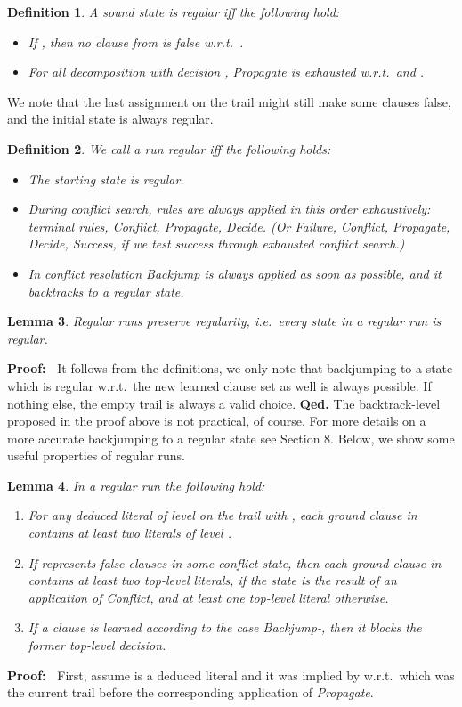 \documentclass[a4paper]{article}
\newcommand{\startproof}{{\bf Proof:~}}
\newcommand{\finishproof}{{\bf Qed.}}
\newtheorem{defi}{Definition}[section]
\newtheorem{lemm}[defi]{Lemma}
\begin{document}
{\begin{defi}\label{regStateDef}
A sound state  is \emph{regular} iff the following hold:
	\begin{itemize}
		\item If , then no clause from  is false w.r.t.\ .
		\item For all decomposition  with decision , \emph{Propagate} is exhausted w.r.t.\
			 and .
	\end{itemize}
\end{defi}
We note that the last assignment on the trail might still make some clauses false, and the initial state  is always regular.
\begin{defi}\label{regRunDef}
We call a run \emph{regular} iff the following holds:
	\begin{itemize}
		\item The starting state is regular.
		\item During conflict search, rules are always applied in this order exhaustively: terminal rules, \emph{Conflict}, \emph{Propagate}, \emph{Decide}.
		(Or \emph{Failure}, \emph{Conflict}, \emph{Propagate}, \emph{Decide}, \emph{Success}, if we test success through exhausted conflict search.)
		\item In conflict resolution \emph{Backjump} is always applied as soon as possible, and it backtracks to a regular state.
	\end{itemize}
\end{defi}
\begin{lemm} Regular runs preserve regularity, i.e.\ every state in a regular run is regular.
\end{lemm}
\startproof
It follows from the definitions, we only note that backjumping to a state which is regular w.r.t.\
the new learned clause set as well is always possible.
If nothing else, the empty trail is always a valid choice. 
\finishproof\leaveabit
\noindent
The backtrack-level proposed in the proof above is not practical, of course.
For more details on a more accurate backjumping to a regular state see Section 8.\leaveabit\noindent
Below, we show some useful properties of regular runs.

\begin{lemm}\label{lemmRegProps} In a regular run the following hold:
  \begin{enumerate}[(1)]
		\item For any deduced literal  of level  on the trail with , each ground clause in  contains at least two literals of level .
		\item If  represents false clauses in some conflict state, then each ground clause in  contains at least two top-level literals, if 
		 the state is the result of an application of \emph{Conflict}, and at least one top-level literal otherwise.
		\item If a clause  is learned according to the case \emph{Backjump}-, then it blocks the former top-level decision.
  \end{enumerate}
\end{lemm}
\noindent
\startproof
First, assume  is a deduced literal and it was implied by  w.r.t.\ 
 which was the current trail before the corresponding application of \emph{Propagate}. 

}
\end{document}
